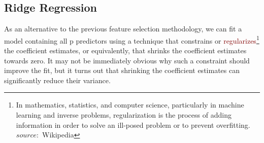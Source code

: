 \documentclass{tufte-handout}
\newcommand{\hlred}[1]{\textcolor{Maroon}{#1}}%
\begin{document}
\subsection{Ridge Regression}

As an alternative to the previous feature selection methodology, we can fit a model containing all p predictors using a technique that constrains or \hlred{regularizes}\footnote{In mathematics, statistics, and computer science, particularly in machine learning and inverse problems, regularization is the process of adding information in order to solve an ill-posed problem or to prevent overfitting.$source   :$ Wikipedia} the coefficient estimates, or equivalently, that shrinks the coefficient estimates towards zero. It may not be immediately obvious why such a constraint should improve the fit, but it turns out that shrinking the coefficient estimates can significantly reduce their variance.
\end{document}
